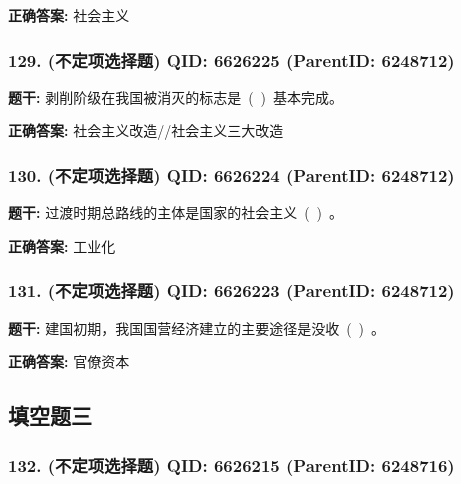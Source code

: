 \documentclass[12pt,UTF8]{ctexart}
\begin{document}
\textbf{正确答案:}
社会主义

\vspace{0.3em}\hrulefill\vspace{0.7em}

\subsubsection*{129. (不定项选择题) \small QID: 6626225 (ParentID: 6248712)}

\textbf{题干:}
剥削阶级在我国被消灭的标志是 ( ) 基本完成。



\textbf{正确答案:}
社会主义改造//社会主义三大改造

\vspace{0.3em}\hrulefill\vspace{0.7em}

\subsubsection*{130. (不定项选择题) \small QID: 6626224 (ParentID: 6248712)}

\textbf{题干:}
过渡时期总路线的主体是国家的社会主义 ( ) 。



\textbf{正确答案:}
工业化

\vspace{0.3em}\hrulefill\vspace{0.7em}

\subsubsection*{131. (不定项选择题) \small QID: 6626223 (ParentID: 6248712)}

\textbf{题干:}
建国初期，我国国营经济建立的主要途径是没收 ( ) 。



\textbf{正确答案:}
官僚资本

\vspace{0.3em}\hrulefill\vspace{0.7em}

\subsection*{填空题三}

\subsubsection*{132. (不定项选择题) \small QID: 6626215 (ParentID: 6248716)}
\end{document}
